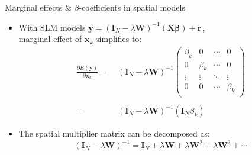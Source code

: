 \documentclass{beamer}
\begin{document}
\begin{frame}{Marginal effects \& $\beta$-coefficients in spatial models}
\begin{itemize}
    \item With SLM models $
\bm{y} = (\bm{I}_N - \lambda \bm{W})^{-1}
         (\bm{X \beta}) + \bm{r} \,$,\\ \medskip 
         marginal effect of $\bm{x}_k$ simplifies to: 
         \begin{equation*}
         \begin{aligned}
         \frac{\partial E(\bm{y})}{\partial \bm{x}_k}
          =&~(\bm{I}_N - \lambda \bm{W})^{-1}
	   \begin{pmatrix}
		\beta_{k} & 0& \cdots & 0\\
		0 & \beta_{k} & \cdots & 0\\
		\vdots & \vdots & \ddots & \vdots \\
		0 & 0 & \cdots & \beta_{k} \\
	   \end{pmatrix} \\
    & \\
    =&~(\bm{I}_N - \lambda \bm{W})^{-1} (\bm{I}_N \beta_k)
    \end{aligned}
    \end{equation*} 
    \item The spatial multiplier matrix can be decomposed as:
    $$
    (\bm{I}_N - \lambda \bm{W})^{-1} = 
    \bm{I}_N + \lambda \bm{W} + \lambda \bm{W}^2 + \lambda \bm{W}^3 + \cdots
    $$
\end{itemize}
\end{frame}
\end{document}

